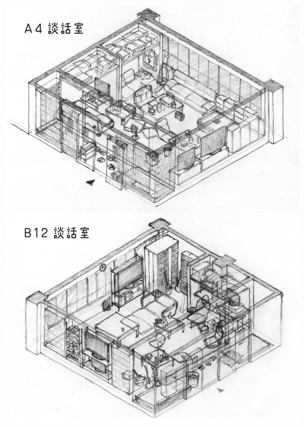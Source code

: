 \newpage
\begin{figure}[bh]
\vspace{10mm}
\centering
\includegraphics[]{gazo/談話室sketch_page-0003.jpg}
\end{figure}

